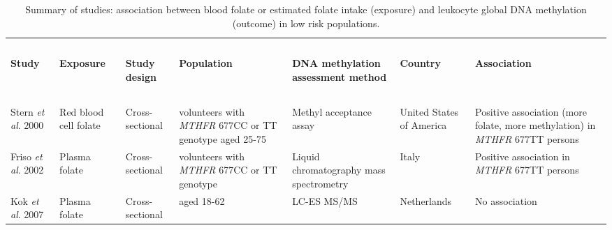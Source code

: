 \begin{center} 
\begin{sidewaystable}
\small
\caption{Summary of studies: association between blood folate or estimated folate intake (exposure) and leukocyte global DNA methylation (outcome) in low risk populations.} 
\label{table7_5}
\begin{tabular}{L{1.8cm}C{1.8cm}C{2cm}C{2.2cm}C{2.7cm}C{1.8cm}C{2.5cm}} 
\hline
~ & ~ & ~ & ~ & ~ & ~ & ~\\
\bfseries Study & \bfseries Exposure & \bfseries Study design & \bfseries Population & \bfseries DNA methylation assessment method & \bfseries Country & \bfseries Association\\
~ & ~ & ~ & ~ & ~ & ~ & ~\\
\hline
\parbox[t][3.4cm]{1.8cm}{\raggedright Stern \textit{et al}. 2000 \cite{c712}} &
\parbox[t][3.4cm]{1.8cm}{\centering Red blood cell folate} &
\parbox[t][3.4cm]{2cm}{\centering Cross-sectional} &
\parbox[t][3.4cm]{2.2cm}{ volunteers with \textit{MTHFR} 677CC or TT genotype aged 25-75} &
\parbox[t][3.4cm]{2.7cm}{\centering Methyl acceptance assay} &
\parbox[t][3.4cm]{1.8cm}{\centering United States of America} &
\parbox[t][3.4cm]{2.5cm}{\centering Positive association (more folate, more methylation) in \textit{MTHFR} 677TT persons}\\

\parbox[t][2.5cm]{1.8cm}{\raggedright Friso \textit{et al}. 2002 \cite{c76}} &
\parbox[t][2.5cm]{1.8cm}{\centering Plasma folate} &
\parbox[t][2.5cm]{2cm}{\centering Cross-sectional} &
\parbox[t][2.5cm]{2.2cm}{ volunteers with \textit{MTHFR} 677CC or TT genotype} &
\parbox[t][2.5cm]{2.7cm}{\centering Liquid chromatography mass spectrometry} &
\parbox[t][2.5cm]{1.8cm}{\centering Italy} &
\parbox[t][2.5cm]{2.5cm}{\centering Positive association in \textit{MTHFR} 677TT persons}\\

\parbox[t][1.5cm]{1.8cm}{\raggedright Kok \textit{et al}. 2007 \cite{c78}} &
\parbox[t][1.5cm]{1.8cm}{\centering Plasma folate} &
\parbox[t][1.5cm]{2cm}{\centering Cross-sectional} &
\parbox[t][1.5cm]{2.2cm}{ aged 18-62} &
\parbox[t][1.5cm]{2.7cm}{\centering LC-ES MS/MS} &
\parbox[t][1.5cm]{1.8cm}{\centering Netherlands} &
\parbox[t][1.5cm]{2.5cm}{\centering No association}\\
\hline
\end{tabular}
\end{sidewaystable}
\end{center}

